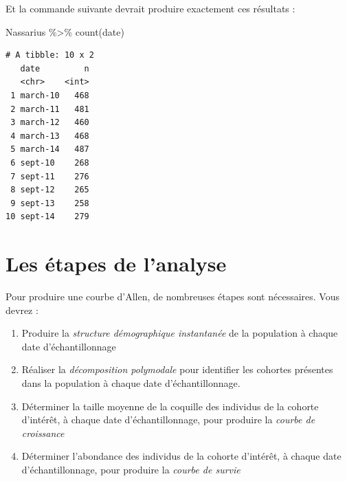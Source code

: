 \documentclass[
  a4paper,
  DIV=11,
  numbers=noendperiod,
  oneside]{scrreprt}
\newenvironment{Shaded}{}{}
\newcommand{\FunctionTok}[1]{\textcolor[rgb]{0.44,0.26,0.76}{#1}}
\newcommand{\NormalTok}[1]{\textcolor[rgb]{0.14,0.16,0.18}{#1}}
\newcommand{\SpecialCharTok}[1]{\textcolor[rgb]{0.00,0.36,0.77}{#1}}
\providecommand{\tightlist}{%
  \setlength{\itemsep}{0pt}\setlength{\parskip}{0pt}}\usepackage{longtable,booktabs,array}
\begin{document}
Et la commande suivante devrait produire exactement ces résultats :

\begin{Shaded}
\begin{Highlighting}[]
\NormalTok{Nassarius }\SpecialCharTok{\%\textgreater{}\%}
  \FunctionTok{count}\NormalTok{(date)}
\end{Highlighting}
\end{Shaded}

\begin{verbatim}
# A tibble: 10 x 2
   date         n
   <chr>    <int>
 1 march-10   468
 2 march-11   481
 3 march-12   460
 4 march-13   468
 5 march-14   487
 6 sept-10    268
 7 sept-11    276
 8 sept-12    265
 9 sept-13    258
10 sept-14    279
\end{verbatim}


\hypertarget{les-uxe9tapes-de-lanalyse}{%
\section{Les étapes de l'analyse}\label{les-uxe9tapes-de-lanalyse}}

Pour produire une courbe d'Allen, de nombreuses étapes sont nécessaires.
Vous devrez :

\begin{enumerate}
\def\labelenumi{\arabic{enumi}.}
\tightlist
\item
  Produire la \emph{structure démographique instantanée} de la
  population à chaque date d'échantillonnage
\item
  Réaliser la \emph{décomposition polymodale} pour identifier les
  cohortes présentes dans la population à chaque date d'échantillonnage.
\item
  Déterminer la taille moyenne de la coquille des individus de la
  cohorte d'intérêt, à chaque date d'échantillonnage, pour produire la
  \emph{courbe de croissance}
\item
  Déterminer l'abondance des individus de la cohorte d'intérêt, à chaque
  date d'échantillonnage, pour produire la \emph{courbe de survie}
\end{enumerate}
\end{document}
